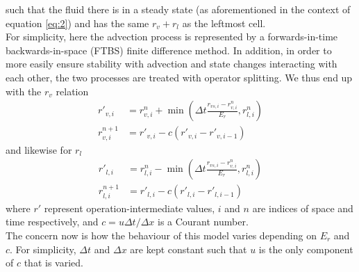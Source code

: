 \documentclass[11pt]{article}
\begin{document}
such that the fluid there is in a steady state (as aforementioned in the context of equation \ref{eq:2}) and has the same $r_v+r_l$ as the leftmost cell. \\
For simplicity, here the advection process is represented by a forwards-in-time backwards-in-space (FTBS) finite difference method. In addition, in order to more easily ensure stability with advection and state changes interacting with each other, the two processes are treated with operator splitting. We thus end up with the $r_v$ relation
\begin{align} \label{eq:4}
r'_{v,i} &= r^n_{v,i} + \min\left(\Delta t\frac{r_{vs,i} - r^n_{v,i}}{E_r},r^n_{l,i}\right) \\ \label{eq:5}
r^{n+1}_{v,i} &= r'_{v,i} - c\left(r'_{v,i} - r'_{v,i-1}\right)
\end{align}
and likewise for $r_l$
\begin{align} \label{eq:6}
r'_{l,i} &= r^n_{l,i} - \min\left(\Delta t\frac{r_{vs,i} - r^n_{v,i}}{E_r},r^n_{l,i}\right) \\ \label{eq:7}
r^{n+1}_{l,i} &= r'_{l,i} - c\left(r'_{l,i} - r'_{l,i-1}\right)
\end{align}
where $r'$ represent operation-intermediate values, $i$ and $n$ are indices of space and time respectively, and $c=u \Delta t/\Delta x$ is a Courant number. \\
The concern now is how the behaviour of this model varies depending on $E_r$ and $c$. For simplicity, $\Delta t$ and $\Delta x$ are kept constant such that $u$ is the only component of $c$ that is varied.
\end{document}
